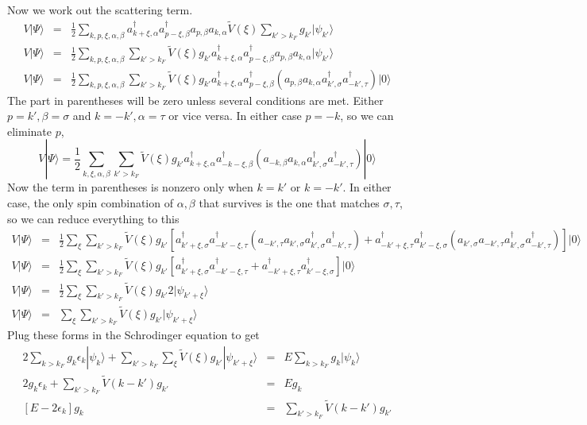\documentclass{article}
\begin{document}
Now we work out the scattering term.\begin{eqnarray*}
V|\Psi\rangle & = & \frac{1}{2}\sum_{k,p,\xi,\alpha,\beta}a_{k+\xi,\alpha}^{\dagger}a_{p-\xi,\beta}^{\dagger}a_{p,\beta}a_{k,\alpha}\tilde{V}(\xi)\sum_{k'>k_{F}}g_{k'}|\psi_{k'}\rangle\\
V|\Psi\rangle & = & \frac{1}{2}\sum_{k,p,\xi,\alpha,\beta}\sum_{k'>k_{F}}\tilde{V}(\xi)g_{k'}a_{k+\xi,\alpha}^{\dagger}a_{p-\xi,\beta}^{\dagger}a_{p,\beta}a_{k,\alpha}|\psi_{k'}\rangle\\
V|\Psi\rangle & = & \frac{1}{2}\sum_{k,p,\xi,\alpha,\beta}\sum_{k'>k_{F}}\tilde{V}(\xi)g_{k'}a_{k+\xi,\alpha}^{\dagger}a_{p-\xi,\beta}^{\dagger}\left(a_{p,\beta}a_{k,\alpha}a_{k',\sigma}^{\dagger}a_{-k',\tau}^{\dagger}\right)|0\rangle\end{eqnarray*}
The part in parentheses will be zero unless several conditions are
met. Either $p=k',\beta=\sigma$ and $k=-k',\alpha=\tau$ or vice
versa. In either case $p=-k$, so we can eliminate $p$,\[
V|\Psi\rangle=\frac{1}{2}\sum_{k,\xi,\alpha,\beta}\sum_{k'>k_{F}}\tilde{V}(\xi)g_{k'}a_{k+\xi,\alpha}^{\dagger}a_{-k-\xi,\beta}^{\dagger}\left(a_{-k,\beta}a_{k,\alpha}a_{k',\sigma}^{\dagger}a_{-k',\tau}^{\dagger}\right)|0\rangle\]
Now the term in parentheses is nonzero only when $k=k'$ or $k=-k'$.
In either case, the only spin combination of $\alpha,\beta$ that
survives is the one that matches $\sigma,\tau$, so we can reduce
everything to this\begin{eqnarray*}
V|\Psi\rangle & = & \frac{1}{2}\sum_{\xi}\sum_{k'>k_{F}}\tilde{V}(\xi)g_{k'}\left[a_{k'+\xi,\sigma}^{\dagger}a_{-k'-\xi,\tau}^{\dagger}\left(a_{-k',\tau}a_{k',\sigma}a_{k',\sigma}^{\dagger}a_{-k',\tau}^{\dagger}\right)+a_{-k'+\xi,\tau}^{\dagger}a_{k'-\xi,\sigma}^{\dagger}\left(a_{k',\sigma}a_{-k',\tau}a_{k',\sigma}^{\dagger}a_{-k',\tau}^{\dagger}\right)\right]|0\rangle\\
V|\Psi\rangle & = & \frac{1}{2}\sum_{\xi}\sum_{k'>k_{F}}\tilde{V}(\xi)g_{k'}\left[a_{k'+\xi,\sigma}^{\dagger}a_{-k'-\xi,\tau}^{\dagger}+a_{-k'+\xi,\tau}^{\dagger}a_{k'-\xi,\sigma}^{\dagger}\right]|0\rangle\\
V|\Psi\rangle & = & \frac{1}{2}\sum_{\xi}\sum_{k'>k_{F}}\tilde{V}(\xi)g_{k'}2|\psi_{k'+\xi}\rangle\\
V|\Psi\rangle & = & \sum_{\xi}\sum_{k'>k_{F}}\tilde{V}(\xi)g_{k'}|\psi_{k'+\xi}\rangle\end{eqnarray*}
Plug these forms in the Schrodinger equation to get\begin{eqnarray*}
2\sum_{k>k_{F}}g_{k}\epsilon_{k}|\psi_{k}\rangle+\sum_{k'>k_{F}}\sum_{\xi}\tilde{V}(\xi)g_{k'}|\psi_{k'+\xi}\rangle & = & E\sum_{k>k_{F}}g_{k}|\psi_{k}\rangle\\
2g_{k}\epsilon_{k}+\sum_{k'>k_{F}}\tilde{V}(k-k')g_{k'} & = & Eg_{k}\\
\left[E-2\epsilon_{k}\right]g_{k} & = & \sum_{k'>k_{F}}\tilde{V}(k-k')g_{k'}\end{eqnarray*}
\end{document}
